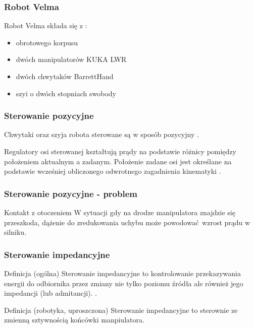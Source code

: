 
\begin{frame}
\frametitle{Robot Velma}
Robot Velma składa się z \cite{docsVelma}:  
\begin{itemize}
	\item obrotowego korpusu
	\item dwóch manipulatorów KUKA LWR
	\item dwóch chwytaków BarrettHand
	\item szyi o dwóch stopniach swobody
\end{itemize}
\end{frame}


\begin{frame}
\frametitle{Sterowanie pozycyjne}
\begin{block}{}
Chwytaki oraz szyja robota sterowane są w sposób pozycyjny \cite{docsVelma}.
\end{block}

\begin{block}{}
Regulatory osi sterowanej kształtują prądy na podstawie różnicy pomiędzy położeniem aktualnym a zadanym.
Położenie zadane osi jest określane na podstawie wcześniej obliczonego odwrotnego zagadnienia kinematyki \cite{sterowanie}.
\end{block}

\end{frame}




\begin{frame}
\frametitle{Sterowanie pozycyjne - problem}

\begin{block}{Kontakt z otoczeniem}
W sytuacji gdy na drodze manipulatora znajdzie się przeszkoda, dążenie do zredukowania uchybu może powodować wzrost prądu
w silniku.
\end{block}

\end{frame}


\begin{frame}
\frametitle{Sterowanie impedancyjne}
\begin{block}{Definicja (ogólna)}
Sterowanie impedancyjne to kontrolowanie przekazywania energii do odbiornika przez zmiany nie tylko poziomu źródła ale również jego impedancji (lub admitancji). \cite{pl}.
\end{block}

\begin{block}{Definicja (robotyka, uproszczona)}
Sterowanie impedancyjne to sterownie ze zmienną sztywnością końcówki manpiulatora. 
\end{block}
\end{frame}

